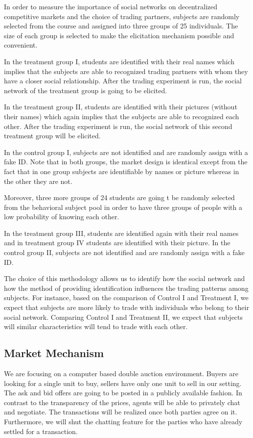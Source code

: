 \documentclass{article}
\begin{document}
In order to measure the importance of social networks on decentralized
competitive markets and the choice of trading partners, subjects are randomly
selected from the course and assigned into three groups of 25 individuals. The
size of each group is selected to make the elicitation mechanism possible and convenient. 

In the treatment group I, students are identified with their real names which
implies that the subjects are able to recognized trading partners with whom they
have a closer social relationship. After the trading experiment is run, the
social network of the treatment group is going to be elicited. 

In the treatment group II, students are identified with their pictures (without their names) which again
implies that the subjects are able to recognized each other.  After the trading experiment is run, the
social network of this second treatment group will be elicited. 

In the control
group I, subjects are not identified and are randomly assign with a fake ID. Note
that in both groups, the market design is identical except from the fact that in
one group subjects are identifiable by names or picture whereas in the other they are not.

Moreover, three more groups of 24 students are going t be randomly selected from the behavioral subject pool in order to have three groups of people with a low probability of knowing each other. 

In the treatment group III, students are identified again with their real names and in treatment group IV students are identified with their picture. In the control
group II, subjects are not identified and are randomly assign with a fake ID. 

The choice of this methodology allows us to identify how the social network
 and how the method of providing identification influences the trading patterns among subjects. For instance, based  on  the  comparison  of Control  I  and  Treatment  I,  we  expect  that  subjects  are  more  likely  to  trade with individuals who belong to their social network.  Comparing Control I and Treatment II, we expect that subjects will similar characteristics will tend to trade with each other. 

\subsection{Market Mechanism}
We are focusing on a computer based double auction environment. Buyers are looking for a single unit to buy, sellers have only one unit to sell in our setting. The ask and bid
offers are going to be posted in a publicly available fashion. In contrast to
the transparency of the prices, agents will be able to privately chat and
negotiate. The transactions will be realized once both parties agree on it. Furthermore, we will shut the chatting feature for the parties who have already settled for a transaction. \\
\end{document}
